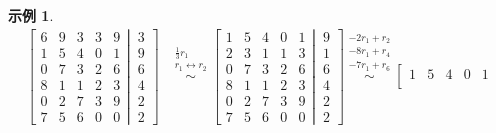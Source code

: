 \documentclass[12pt]{article}
\newtheorem*{example}{示例}
\begin{document}
\begin{example}
        \begin{align*}
            \left[\begin{matrix}
                6& 9& 3& 3& 9\\
                1& 5& 4& 0& 1\\
                0& 7& 3& 2& 6\\
                8& 1& 1& 2& 3\\
                0& 2& 7& 3& 9\\
                7& 5& 6& 0& 0
            \end{matrix}
            \left|
                \,
                \begin{matrix}
                3\\9\\6\\4\\2\\2
                \end{matrix}
            \right.
            \right]&\overset{\begin{matrix}
                \frac{1}{3}r_1\\
                r_1\leftrightarrow r_2
            \end{matrix}}{\sim}\left[\begin{matrix}
                1& 5& 4& 0& 1\\
                2& 3& 1& 1& 3\\
                0& 7& 3& 2& 6\\
                8& 1& 1& 2& 3\\
                0& 2& 7& 3& 9\\
                7& 5& 6& 0& 0
            \end{matrix}
            \left|
                \,
                \begin{matrix}
                9\\1\\6\\4\\2\\2
                \end{matrix}
            \right.
            \right]\overset{\begin{matrix}
                -2r_1 + r_2\\ -8r_1 + r_4\\ -7r_1+r_6
            \end{matrix}}{\sim}\left[\begin{matrix}
                1& 5& 4& 0& 1\\

\end{matrix}
\end{align*}
\end{example}
\end{document}
